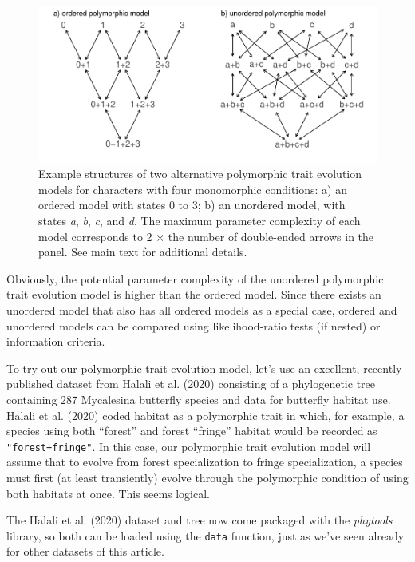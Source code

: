 \documentclass[fleqn,10pt,lineno]{wlpeerj} %
\begin{document}
\begin{figure}
\includegraphics[width=1\linewidth]{Revell.phytools-v2_peerj_files/figure-latex/structure-polyMk-1} \caption{Example structures of two alternative polymorphic trait evolution models for characters with four monomorphic conditions: a) an ordered model with states 0 to 3; b) an unordered model, with states \textit{a}, \textit{b}, \textit{c}, and \textit{d}. The maximum parameter complexity of each model corresponds to 2 $\times$ the number of double-ended arrows in the panel. See main text for additional details.}\label{fig:structure-polyMk}
\end{figure}

Obviously, the potential parameter complexity of the unordered polymorphic trait evolution model is higher than the ordered model. Since there exists an unordered model that also has all ordered models as a special case, ordered and unordered models can be compared using likelihood-ratio tests (if nested) or information criteria.

To try out our polymorphic trait evolution model, let's use an excellent, recently-published dataset from Halali et al. (2020) consisting of a phylogenetic tree containing 287 Mycalesina butterfly species and data for butterfly habitat use. Halali et al. (2020) coded habitat as a polymorphic trait in which, for example, a species using both ``forest'' and forest ``fringe'' habitat would be recorded as \texttt{"forest+fringe"}. In this case, our polymorphic trait evolution model will assume that to evolve from forest specialization to fringe specialization, a species must first (at least transiently) evolve through the polymorphic condition of using both habitats at once. This seems logical.

The Halali et al. (2020) dataset and tree now come packaged with the \emph{phytools} library, so both can be loaded using the \texttt{data} function, just as we've seen already for other datasets of this article.
\end{document}

